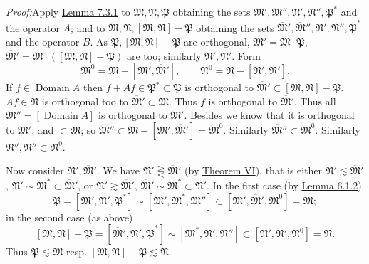 \documentclass[12pt,b5paper,twoside]{article}
\newcommand{\Proof}{\par\noindent\textit{Proof:}\enspace}
\newcommand{\lemref}[1]{\hyperref[lem:#1]{Lemma #1}}
\newcommand{\thmref}[1]{\hyperref[thm:#1]{Theorem #1}}
\begin{document}
\Proof Apply \lemref{7.3.1} to \(\mathfrak M,\mathfrak N,\mathfrak P\)
obtaining the sets
\(\mathfrak M',\mathfrak M'',\mathfrak N',\mathfrak N'',\mathfrak P^*\)
and the operator \(A\); and to
\(\mathfrak M,\mathfrak N,[\mathfrak M,\mathfrak N]-\mathfrak P\)
obtaining the sets
\(\overline{\mathfrak M}',\overline{\mathfrak M}'',
\overline{\mathfrak N}',\overline{\mathfrak N}'',
\overline{\mathfrak P}^*\) and the operator \(B\). As
\(\mathfrak P,[\mathfrak M,\mathfrak N]-\mathfrak P\) are orthogonal,
\(\mathfrak M'=\mathfrak M\mathbin{\cdot}\mathfrak P\),
\(\overline{\mathfrak M}'
=\mathfrak M\mathbin{\cdot}([\mathfrak M,\mathfrak N]-\mathfrak P)\)
are too; similarly \(\mathfrak N',\overline{\mathfrak N}'\). Form
\[
 \mathfrak M^0=\mathfrak M-[\mathfrak M',\overline{\mathfrak M}'],
 \qquad
 \mathfrak N^0=\mathfrak N-[\mathfrak N',\overline{\mathfrak N}'].
\]
If \(f\in\operatorname{Domain}A\) then
\(f+Af\in\mathfrak P^*\subset\mathfrak P\) is orthogonal to
\(\overline{\mathfrak M}'\subset[\mathfrak M,\mathfrak N]-\mathfrak P\).
\(Af\in\mathfrak N\) is orthogonal too to
\(\overline{\mathfrak M}'\subset\mathfrak M\). Thus \(f\) is
orthogonal to \(\overline{\mathfrak M}'\). Thus all
\(\mathfrak M''=[\operatorname{Domain}A]\) is orthogonal to
\(\overline{\mathfrak M}'\). Besides we know that it is orthogonal to
\(\mathfrak M'\), and \(\subset\mathfrak M\); so
\(\mathfrak M''\subset\mathfrak M-[\mathfrak M',
\overline{\mathfrak M}']=\mathfrak M^0\). Similarly
\(\overline{\mathfrak M}''\subset\mathfrak M^0\). Similarly
\(\mathfrak N'',\overline{\mathfrak N}''\subset\mathfrak N^0\).

Now consider \(\mathfrak N',\overline{\mathfrak M}'\). We have
\(\mathfrak N'\gtreqless\overline{\mathfrak M}'\) (by \thmref{VI}),
that is either
\(\mathfrak N'\lesssim\overline{\mathfrak M}'\),
\(\mathfrak N'\sim\mathfrak M^*\subset\overline{\mathfrak M}'\), or
\(\mathfrak N'\gtrsim\overline{\mathfrak M}'\),
\(\overline{\mathfrak M}'\sim\mathfrak M^*\subset\mathfrak N'\). In the
first case (by \lemref{6.1.2})
\[
 \mathfrak P=[\mathfrak M',\mathfrak N',\mathfrak P^*]
 \sim[\mathfrak M',\mathfrak M^*,\mathfrak M'']
 \subset[\mathfrak M',\overline{\mathfrak M}',\mathfrak M^0]
 =\mathfrak M;
\]
in the second case (as above)
\[
 [\mathfrak M,\mathfrak N]-\mathfrak P
 =[\overline{\mathfrak M}',\overline{\mathfrak N}',
   \overline{\mathfrak P}^*]
 \sim[\mathfrak M^*,\overline{\mathfrak N}',
   \overline{\mathfrak N}'']
 \subset[\mathfrak N',\overline{\mathfrak N}',\mathfrak N^0]
 =\mathfrak N.
\]
Thus \(\mathfrak P\lesssim\mathfrak M\) resp.
\([\mathfrak M,\mathfrak N]-\mathfrak P\lesssim\mathfrak N\).
\end{document}
